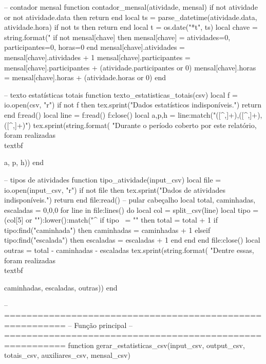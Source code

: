 \begin{luacode*}
-- contador mensal
function contador_mensal(atividade, mensal)
  if not atividade or not atividade.data then return end
  local ts = parse_datetime(atividade.data, atividade.hora)
  if not ts then return end
  local t = os.date("*t", ts)
  local chave = string.format("%
  if not mensal[chave] then
    mensal[chave] = {atividades=0, participantes=0, horas=0}
  end
  mensal[chave].atividades = mensal[chave].atividades + 1
  mensal[chave].participantes = mensal[chave].participantes + (atividade.participantes or 0)
  mensal[chave].horas = mensal[chave].horas + (atividade.horas or 0)
end

-- texto estatísticas totais
function texto_estatisticas_totais(csv)
  local f = io.open(csv, "r")
  if not f then
    tex.sprint("Dados estatísticos indisponíveis.")
    return
  end
  f:read()
  local line = f:read()
  f:close()
  local a,p,h = line:match("([^,]+),([^,]+),([^,]+)")
  tex.sprint(string.format(
    "Durante o período coberto por este relatório, foram realizadas \\textbf{%
    a, p, h))
end

-- tipos de atividades
function tipo_atividade(input_csv)
  local file = io.open(input_csv, "r")
  if not file then
    tex.sprint("Dados de atividades indisponíveis.")
    return
  end
  file:read() -- pular cabeçalho
  local total, caminhadas, escaladas = 0,0,0
  for line in file:lines() do
    local col = split_csv(line)
    local tipo = (col[5] or ""):lower():match("^%
    if tipo ~= "" then
      total = total + 1
      if tipo:find("caminhada") then
        caminhadas = caminhadas + 1
      elseif tipo:find("escalada") then
        escaladas = escaladas + 1
      end
    end
  end
  file:close()
  local outras = total - caminhadas - escaladas
  tex.sprint(string.format(
    "Dentre essas, foram realizadas \\textbf{%
    caminhadas, escaladas, outras))
end

-- =========================================================
-- Função principal
-- =========================================================
function gerar_estatisticas_csv(input_csv, output_csv, totais_csv, auxiliares_csv, mensal_csv)

}}
\end{luacode*}
